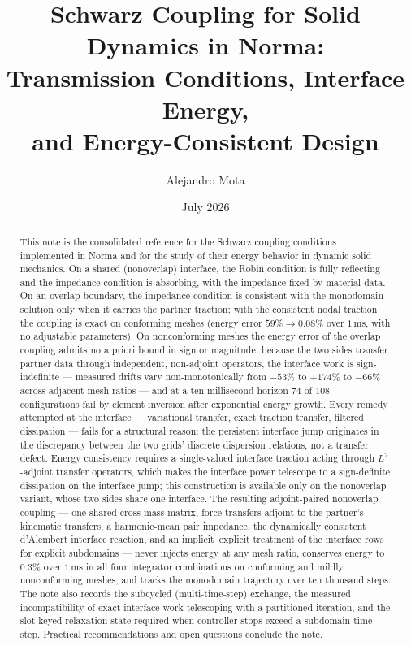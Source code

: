 \documentclass[11pt]{article}
\title{Schwarz Coupling for Solid Dynamics in Norma:\\
Transmission Conditions, Interface Energy,\\
and Energy-Consistent Design}
\author{Alejandro Mota}
\date{July 2026}
\begin{document}
\maketitle

\begin{abstract}
This note is the consolidated reference for the Schwarz coupling conditions
implemented in Norma and for the study of their energy behavior in
dynamic solid mechanics. On a shared (nonoverlap) interface, the Robin
condition is fully reflecting and the impedance condition is absorbing, with
the impedance fixed by material data. On an overlap boundary, the impedance
condition is consistent with the monodomain solution only when it carries
the partner traction; with the consistent nodal traction the coupling is
exact on conforming meshes (energy error $59\% \to 0.08\%$ over $1$\,ms,
with no adjustable parameters). On nonconforming meshes the energy error of
the overlap coupling admits no a priori bound in sign or magnitude: because
the two sides transfer partner data through independent, non-adjoint
operators, the interface work is sign-indefinite --- measured drifts vary non-monotonically from $-53\%$ to $+174\%$ to
$-66\%$ across adjacent mesh ratios --- and at a ten-millisecond horizon
$74$ of $108$ configurations fail by element inversion after exponential
energy growth. Every remedy attempted at the interface --- variational
transfer, exact traction transfer, filtered dissipation --- fails for a
structural reason: the persistent interface jump originates in the discrepancy between
the two grids' discrete dispersion relations, not a transfer defect. Energy
consistency requires a single-valued interface traction acting through
$L^2$-adjoint transfer operators, which makes the interface power telescope
to a sign-definite dissipation on the interface jump; this construction is
available only on the nonoverlap variant, whose two sides share one
interface. The resulting adjoint-paired nonoverlap coupling --- one shared
cross-mass matrix, force transfers adjoint to the partner's kinematic
transfers, a harmonic-mean pair impedance, the dynamically consistent
d'Alembert interface reaction, and an implicit--explicit treatment of the
interface rows for explicit subdomains --- never injects energy at any mesh
ratio, conserves energy to $0.3\%$ over $1$\,ms in all four integrator
combinations on conforming and mildly nonconforming meshes, and tracks the
monodomain trajectory over ten thousand steps. The note also records the
subcycled (multi-time-step) exchange, the measured incompatibility of exact
interface-work telescoping with a partitioned iteration, and the slot-keyed
relaxation state required when controller stops exceed a subdomain time
step. Practical recommendations and open questions conclude the note.
\end{abstract}
\end{document}

